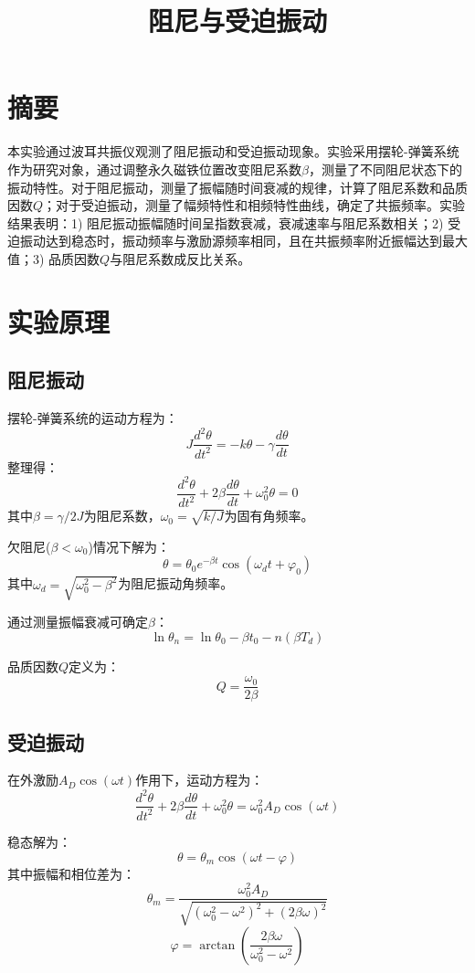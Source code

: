 \documentclass[UTF8]{ctexart}
\title{阻尼与受迫振动}
\author{}
\date{}
\begin{document}
\maketitle

\section{摘要}
本实验通过波耳共振仪观测了阻尼振动和受迫振动现象。实验采用摆轮-弹簧系统作为研究对象，通过调整永久磁铁位置改变阻尼系数$\beta$，测量了不同阻尼状态下的振动特性。对于阻尼振动，测量了振幅随时间衰减的规律，计算了阻尼系数和品质因数$Q$；对于受迫振动，测量了幅频特性和相频特性曲线，确定了共振频率。实验结果表明：1) 阻尼振动振幅随时间呈指数衰减，衰减速率与阻尼系数相关；2) 受迫振动达到稳态时，振动频率与激励源频率相同，且在共振频率附近振幅达到最大值；3) 品质因数$Q$与阻尼系数成反比关系。

\section{实验原理}
\subsection{阻尼振动}
摆轮-弹簧系统的运动方程为：
\[ J\frac{d^2\theta}{dt^2} = -k\theta - \gamma\frac{d\theta}{dt} \]
整理得：
\[ \frac{d^2\theta}{dt^2} + 2\beta\frac{d\theta}{dt} + \omega_0^2\theta = 0 \]
其中$\beta=\gamma/2J$为阻尼系数，$\omega_0=\sqrt{k/J}$为固有角频率。

欠阻尼($\beta<\omega_0$)情况下解为：
\[ \theta = \theta_0 e^{-\beta t}\cos(\omega_d t + \varphi_0) \]
其中$\omega_d=\sqrt{\omega_0^2-\beta^2}$为阻尼振动角频率。

通过测量振幅衰减可确定$\beta$：
\[ \ln\theta_n = \ln\theta_0 - \beta t_0 - n(\beta T_d) \]

品质因数$Q$定义为：
\[ Q = \frac{\omega_0}{2\beta} \]

\subsection{受迫振动}
在外激励$A_D\cos(\omega t)$作用下，运动方程为：
\[ \frac{d^2\theta}{dt^2} + 2\beta\frac{d\theta}{dt} + \omega_0^2\theta = \omega_0^2 A_D\cos(\omega t) \]

稳态解为：
\[ \theta = \theta_m\cos(\omega t - \varphi) \]
其中振幅和相位差为：
\[ \theta_m = \frac{\omega_0^2 A_D}{\sqrt{(\omega_0^2-\omega^2)^2 + (2\beta\omega)^2}} \]
\[ \varphi = \arctan\left(\frac{2\beta\omega}{\omega_0^2-\omega^2}\right) \]
\end{document}
